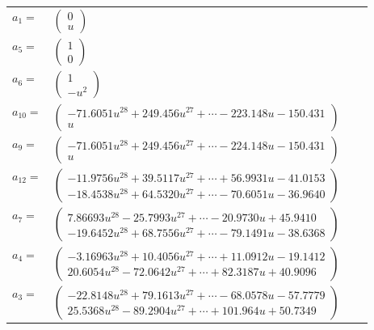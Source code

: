 \documentclass[1p]{elsarticle_modified}
\theoremstyle{definition}
\begin{document}
\begin{tabular}{m{7pt} m{180pt} m{7pt} m{180pt} }
\flushright $a_{1}=$&$\begin{pmatrix}0\\u\end{pmatrix}$ \\
\flushright $a_{5}=$&$\begin{pmatrix}1\\0\end{pmatrix}$ \\
\flushright $a_{6}=$&$\begin{pmatrix}1\\- u^2\end{pmatrix}$ \\
\flushright $a_{10}=$&$\begin{pmatrix}-71.6051 u^{28}+249.456 u^{27}+\cdots-223.148 u-150.431\\u\end{pmatrix}$ \\
\flushright $a_{9}=$&$\begin{pmatrix}-71.6051 u^{28}+249.456 u^{27}+\cdots-224.148 u-150.431\\u\end{pmatrix}$ \\
\flushright $a_{12}=$&$\begin{pmatrix}-11.9756 u^{28}+39.5117 u^{27}+\cdots+56.9931 u-41.0153\\-18.4538 u^{28}+64.5320 u^{27}+\cdots-70.6051 u-36.9640\end{pmatrix}$ \\
\flushright $a_{7}=$&$\begin{pmatrix}7.86693 u^{28}-25.7993 u^{27}+\cdots-20.9730 u+45.9410\\-19.6452 u^{28}+68.7556 u^{27}+\cdots-79.1491 u-38.6368\end{pmatrix}$ \\
\flushright $a_{4}=$&$\begin{pmatrix}-3.16963 u^{28}+10.4056 u^{27}+\cdots+11.0912 u-19.1412\\20.6054 u^{28}-72.0642 u^{27}+\cdots+82.3187 u+40.9096\end{pmatrix}$ \\
\flushright $a_{3}=$&$\begin{pmatrix}-22.8148 u^{28}+79.1613 u^{27}+\cdots-68.0578 u-57.7779\\25.5368 u^{28}-89.2904 u^{27}+\cdots+101.964 u+50.7349\end{pmatrix}$ \\

\end{tabular}
\end{document}
